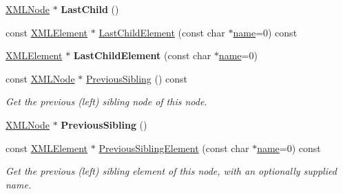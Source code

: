 \begin{DoxyCompactItemize}
\mbox{\label{classtinyxml2_1_1_x_m_l_node_ad7552c8cb1dc0cb6f3bdc14a9d115dbf}} 
\hyperlink{classtinyxml2_1_1_x_m_l_node}{X\+M\+L\+Node} $\ast$ {\bfseries Last\+Child} ()
\item 
const \hyperlink{classtinyxml2_1_1_x_m_l_element}{X\+M\+L\+Element} $\ast$ \hyperlink{classtinyxml2_1_1_x_m_l_node_a609e02f02044f39b928d1a3e0de9f532}{Last\+Child\+Element} (const char $\ast$\hyperlink{structname}{name}=0) const
\item 
\mbox{\label{classtinyxml2_1_1_x_m_l_node_a1b77a8194d059665a4412ebfea276878}} 
\hyperlink{classtinyxml2_1_1_x_m_l_element}{X\+M\+L\+Element} $\ast$ {\bfseries Last\+Child\+Element} (const char $\ast$\hyperlink{structname}{name}=0)
\item 
\mbox{\label{classtinyxml2_1_1_x_m_l_node_aac667c513d445f8b783e1e15ef9d3551}} 
const \hyperlink{classtinyxml2_1_1_x_m_l_node}{X\+M\+L\+Node} $\ast$ \hyperlink{classtinyxml2_1_1_x_m_l_node_aac667c513d445f8b783e1e15ef9d3551}{Previous\+Sibling} () const
\begin{DoxyCompactList}\small\item\em Get the previous (left) sibling node of this node. \end{DoxyCompactList}\item 
\mbox{\label{classtinyxml2_1_1_x_m_l_node_ae760e5e7e766df1d2cf3bb4a847876d6}} 
\hyperlink{classtinyxml2_1_1_x_m_l_node}{X\+M\+L\+Node} $\ast$ {\bfseries Previous\+Sibling} ()
\item 
\mbox{\label{classtinyxml2_1_1_x_m_l_node_a9453cda5e970375a7b1b2099f8a7c40a}} 
const \hyperlink{classtinyxml2_1_1_x_m_l_element}{X\+M\+L\+Element} $\ast$ \hyperlink{classtinyxml2_1_1_x_m_l_node_a9453cda5e970375a7b1b2099f8a7c40a}{Previous\+Sibling\+Element} (const char $\ast$\hyperlink{structname}{name}=0) const
\begin{DoxyCompactList}\small\item\em Get the previous (left) sibling element of this node, with an optionally supplied name. \end{DoxyCompactList}\item 
\mbox{\label{classtinyxml2_1_1_x_m_l_node_ae4f37eb6cd405bdf1d57caa066e36d87}} 

\end{DoxyCompactItemize}
